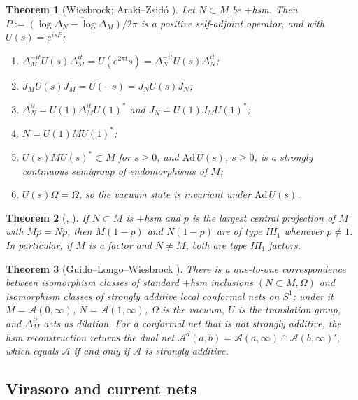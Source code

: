 \documentclass[12pt]{article}
\newtheorem{theorem}{Theorem}[section]
\theoremstyle{definition}
\theoremstyle{remark}
\begin{document}
\begin{theorem}[Wiesbrock; Araki--Zsid\'o {\cite[Thm.~2.1]{AZ}}]\label{thm:AZ}
Let \(N\subset M\) be \(+\)hsm. Then \(P:=\overline{(\log\Delta_N-\log\Delta_M)/2\pi}\)
is a positive self-adjoint operator, and with \(U(s)=e^{isP}\):
\begin{enumerate}[label=(\arabic*),leftmargin=2em,itemsep=1pt]
\item \(\Delta_M^{-it}U(s)\Delta_M^{it}=U(e^{2\pi t}s)=\Delta_N^{-it}U(s)\Delta_N^{it}\);
\item \(J_MU(s)J_M=U(-s)=J_NU(s)J_N\);
\item \(\Delta_N^{it}=U(1)\Delta_M^{it}U(1)^*\) and \(J_N=U(1)J_MU(1)^*\);
\item \(N=U(1)MU(1)^*\);
\item \(U(s)MU(s)^*\subset M\) for \(s\ge0\), and \(\mathrm{Ad}\,U(s)\), \(s\ge0\), is
a strongly continuous semigroup of endomorphisms of \(M\);
\item \(U(s)\Omega=\Omega\), so the vacuum state is invariant under \(\mathrm{Ad}\,U(s)\).
\end{enumerate}
\end{theorem}

\begin{theorem}[{\cite[Thm.~2.2(4)]{AZ}}, {\cite[Cor.~1.8]{GLW}}]\label{thm:type}
If \(N\subset M\) is \(+\)hsm and \(p\) is the largest central projection of \(M\)
with \(Mp=Np\), then \(M(1-p)\) and \(N(1-p)\) are of type III\(_1\) whenever
\(p\ne1\). In particular, if \(M\) is a factor and \(N\ne M\), both are type III\(_1\)
factors.
\end{theorem}

\begin{theorem}[Guido--Longo--Wiesbrock {\cite[Cor.~1.7--1.9]{GLW}}]\label{thm:GLW}
There is a one-to-one correspondence between isomorphism classes of
\emph{standard} \(+\)hsm inclusions \((N\subset M,\Omega)\) and isomorphism
classes of strongly additive local conformal nets on \(S^1\); under it
\(M=\mathcal A(0,\infty)\), \(N=\mathcal A(1,\infty)\), \(\Omega\) is the vacuum,
\(U\) is the translation group, and \(\Delta_M^{it}\) acts as dilation. For a
conformal net that is not strongly additive, the hsm reconstruction returns the
dual net \(\mathcal A^d(a,b)=\mathcal A(a,\infty)\cap\mathcal A(b,\infty)'\), which
equals \(\mathcal A\) if and only if \(\mathcal A\) is strongly additive.
\end{theorem}

\subsection{Virasoro and current nets}
\end{document}
